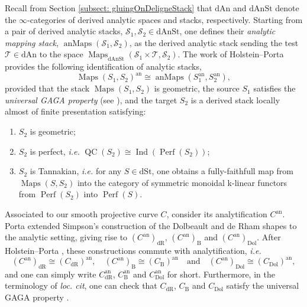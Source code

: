 \documentclass[11pt, a4paper]{amsart}
\numberwithin{equation}{section}
\theoremstyle{definition}
\theoremstyle{remark}
\DeclareMathOperator{\Maps}{Maps}
\DeclareMathOperator{\anMaps}{anMaps}
\DeclareMathOperator{\an}{an}
\DeclareMathOperator{\Perf}{Perf}
\DeclareMathOperator{\Dol}{Dol}
\DeclareMathOperator{\dR}{dR}
\DeclareMathOperator{\QC}{QC}
\DeclareMathOperator{\Ind}{\mathrm{Ind}}
\newcommand{\Ss}{\mathcal{S}}
\newcommand{\Tt}{\mathcal{T}}
\newcommand{\B}{\mathrm{B}}
\begin{document}
Recall from Section \ref{subsect: gluingOnDeligneStack} that $\mathrm{dAn}$ and $\mathrm{dAnSt}$ denote the $\infty$-categories of derived analytic spaces and stacks, respectively. Starting from a pair of derived analytic stacks, $\Ss_1, \Ss_2 \in \mathrm{dAnSt}$, one defines their {\it analytic mapping stack}, $\anMaps(\Ss_1, \Ss_2)$, as the derived analytic stack sending the test $\Tt \in \mathrm{dAn}$ to the space $\Maps_{\mathrm{dAnSt}}(\Ss_1 \times \Tt, \Ss_2)$. The work of Holstein--Porta \cite[Theorem 6.14]{holstein&porta} provides the following identification of analytic stacks,
\[
\Maps(S_1,S_2)^{\an} \cong \anMaps(S_1^{\an},S_2^{\an}),
\]
provided that the stack $\Maps(S_1,S_2)$ is geometric, the source $S_1$ satisfies the {\it universal GAGA property} (see \cite[Definition 5.1]{holstein&porta}), and the target $S_2$ is a derived stack locally almost of finite presentation satisfying:
\begin{enumerate}[label=(C\arabic*),ref=C\arabic*]

\item \label{cond C1} $S_2$ is geometric;

\item \label{cond C2} $S_2$ is perfect, {\it i.e.} $\QC(S_2) \cong \Ind(\Perf(S_2))$;

\item \label{cond C3}  $S_2$ is Tannakian, {\it i.e.} for any $S \in \mathrm{dSt}$, one obtains a fully-faithfull map from $\Maps(S,S_2)$ into the category of symmetric monoidal k-linear functors from $\Perf(S_2)$ into $\Perf(S)$.
\end{enumerate}



Associated to our smooth projective curve $C$, consider its analytification $C^{\an}$. Porta \cite{porta} extended Simpson's construction of the Dolbeault and de Rham shapes to the analytic setting, giving rise to $(C^{\an})_{\dR}$, $(C^{\an})_{\B}$ and $(C^{\an})_{\Dol}$. After Holstein--Porta \cite[Lemmas 5.24, 5.27 and 5.31]{holstein&porta}, these constructions commute with analytification, {\it i.e.}
\[
(C^{\an})_{\dR} \cong (C_{\dR})^{\an}, \quad(C^{\an})_{\B} \cong (C_{\B})^{\an} \quad \text{and} \quad (C^{\an})_{\Dol} \cong (C_{\Dol})^{\an},
\]
and one can simply write $C^{\an}_{\dR}$, $C^{\an}_{\B}$ and $C^{\an}_{\Dol}$ for short. Furthermore, in the terminology of \textit{loc. cit}, one can check that $C_{\dR}$, $C_{\B}$ and $C_{\Dol}$ satisfy the universal GAGA property \cite[Propositions 5.26, 5.28 and 5.32]{holstein&porta}.  
\end{document}
